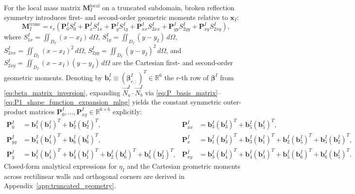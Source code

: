 \documentclass[VANCOUVER]{USG}
\begin{document}
For the local mass matrix $\mathbf{M}_I^{\mathrm{local}}$ on a truncated subdomain, broken reflection symmetry introduces first- and second-order geometric moments relative to $\mathbf{x}_I$:
\begin{equation}
    \mathbf{M}_I^{\mathrm{trunc}} = \epsilon_r \left( \mathbf{P}_0^I S_0^I + \mathbf{P}_x^I S_{1x}^I + \mathbf{P}_y^I S_{1y}^I + \mathbf{P}_{xx}^I S_{2xx}^I + \mathbf{P}_{yy}^I S_{2yy}^I + \mathbf{P}_{xy}^I S_{2xy}^I \right),
    \label{eq:m_truncated_moments}
\end{equation}
where $S_{1x}^I = \iint_{D_I} (x - x_I)\,d\Omega$, $S_{1y}^I = \iint_{D_I} (y - y_I)\,d\Omega$, $S_{2xx}^I = \iint_{D_I} (x - x_I)^2\,d\Omega$, $S_{2yy}^I = \iint_{D_I} (y - y_I)^2\,d\Omega$, and $S_{2xy}^I = \iint_{D_I} (x - x_I)(y - y_I)\,d\Omega$ are the Cartesian first- and second-order geometric moments. Denoting by $\mathbf{b}_r^I \equiv (\boldsymbol{\beta}_{r,:}^I)^T \in \mathbb{R}^6$ the $r$-th row of $\boldsymbol{\beta}^I$ from \eqref{eq:beta_matrix_inversion}, expanding $\vec{N}_a^I \cdot \vec{N}_b^I$ via \eqref{eq:P_basis_matrix}--\eqref{eq:P1_shape_function_expansion_mlpg} yields the constant symmetric outer-product matrices $\mathbf{P}_0^I, \dots, \mathbf{P}_{xy}^I \in \mathbb{R}^{6 \times 6}$ explicitly:
\begin{equation}
    \begin{aligned}
        \mathbf{P}_0^I    & = \mathbf{b}_1^I (\mathbf{b}_1^I)^T + \mathbf{b}_2^I (\mathbf{b}_2^I)^T, &
        \mathbf{P}_{xx}^I & = \mathbf{b}_3^I (\mathbf{b}_3^I)^T + \mathbf{b}_5^I (\mathbf{b}_5^I)^T, \\
        \mathbf{P}_{yy}^I & = \mathbf{b}_4^I (\mathbf{b}_4^I)^T + \mathbf{b}_6^I (\mathbf{b}_6^I)^T, &
        \mathbf{P}_x^I    & = \mathbf{b}_1^I (\mathbf{b}_3^I)^T + \mathbf{b}_3^I (\mathbf{b}_1^I)^T + \mathbf{b}_2^I (\mathbf{b}_5^I)^T + \mathbf{b}_5^I (\mathbf{b}_2^I)^T, \\
        \mathbf{P}_y^I    & = \mathbf{b}_1^I (\mathbf{b}_4^I)^T + \mathbf{b}_4^I (\mathbf{b}_1^I)^T + \mathbf{b}_2^I (\mathbf{b}_6^I)^T + \mathbf{b}_6^I (\mathbf{b}_2^I)^T, &
        \mathbf{P}_{xy}^I & = \mathbf{b}_3^I (\mathbf{b}_4^I)^T + \mathbf{b}_4^I (\mathbf{b}_3^I)^T + \mathbf{b}_5^I (\mathbf{b}_6^I)^T + \mathbf{b}_6^I (\mathbf{b}_5^I)^T.
    \end{aligned}
    \label{eq:P_outer_products}
\end{equation}
Closed-form analytical expressions for $\eta_I$ and the Cartesian geometric moments across rectilinear walls and orthogonal corners are derived in Appendix~\ref{app:truncated_geometry}.
\end{document}
